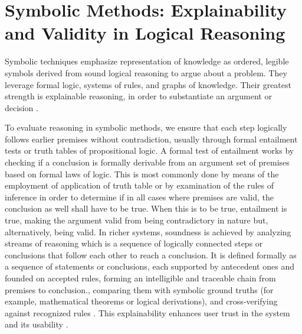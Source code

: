 \documentclass[conference]{IEEEtran}
\begin{document}
\section{Symbolic Methods: Explainability and Validity in Logical Reasoning}
Symbolic techniques emphasize representation of knowledge as ordered, legible symbols derived from sound logical reasoning to argue about a problem. They leverage formal logic, systems of rules, and graphs of knowledge. Their greatest strength is explainable reasoning, in order to substantiate an argument or decision \cite{b11}. 

To evaluate reasoning in symbolic methods, we ensure that each step logically follows earlier premises without contradiction, usually through formal entailment tests or truth tables of propositional logic. A formal test of entailment works by checking if a conclusion is formally derivable from an argument set of premises based on formal laws of logic. This is most commonly done by means of the employment of application of truth table or by examination of the rules of inference in order to determine if in all cases where premises are valid, the conclusion as well shall have to be true. When this is to be true, entailment is true, making the argument valid from being contradictory in nature but, alternatively, being valid. In richer systems, soundness is achieved by analyzing streams of reasoning which is a sequence of logically connected steps or conclusions that follow each other to reach a conclusion. It is defined formally as a sequence of statements or conclusions, each supported by antecedent ones and founded on accepted rules, forming an intelligible and traceable chain from premises to conclusion., comparing them with symbolic ground truths (for example, mathematical theorems or logical derivations), and cross-verifying against recognized rules \cite{b20}. This explainability enhances user trust in the system and its usability \cite{b11}.
\end{document}
